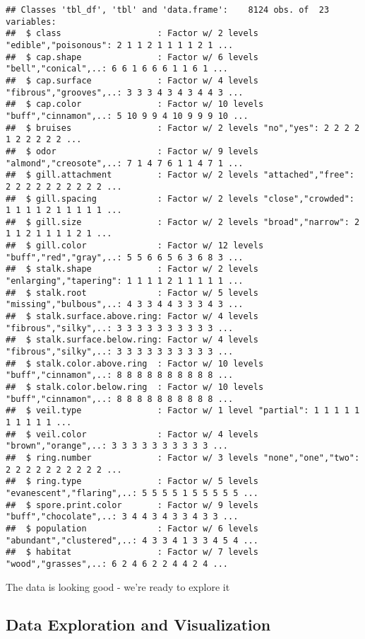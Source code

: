 \documentclass[]{article}
\begin{document}
\begin{verbatim}
## Classes 'tbl_df', 'tbl' and 'data.frame':    8124 obs. of  23 variables:
##  $ class                   : Factor w/ 2 levels "edible","poisonous": 2 1 1 2 1 1 1 1 2 1 ...
##  $ cap.shape               : Factor w/ 6 levels "bell","conical",..: 6 6 1 6 6 6 1 1 6 1 ...
##  $ cap.surface             : Factor w/ 4 levels "fibrous","grooves",..: 3 3 3 4 3 4 3 4 4 3 ...
##  $ cap.color               : Factor w/ 10 levels "buff","cinnamon",..: 5 10 9 9 4 10 9 9 9 10 ...
##  $ bruises                 : Factor w/ 2 levels "no","yes": 2 2 2 2 1 2 2 2 2 2 ...
##  $ odor                    : Factor w/ 9 levels "almond","creosote",..: 7 1 4 7 6 1 1 4 7 1 ...
##  $ gill.attachment         : Factor w/ 2 levels "attached","free": 2 2 2 2 2 2 2 2 2 2 ...
##  $ gill.spacing            : Factor w/ 2 levels "close","crowded": 1 1 1 1 2 1 1 1 1 1 ...
##  $ gill.size               : Factor w/ 2 levels "broad","narrow": 2 1 1 2 1 1 1 1 2 1 ...
##  $ gill.color              : Factor w/ 12 levels "buff","red","gray",..: 5 5 6 6 5 6 3 6 8 3 ...
##  $ stalk.shape             : Factor w/ 2 levels "enlarging","tapering": 1 1 1 1 2 1 1 1 1 1 ...
##  $ stalk.root              : Factor w/ 5 levels "missing","bulbous",..: 4 3 3 4 4 3 3 3 4 3 ...
##  $ stalk.surface.above.ring: Factor w/ 4 levels "fibrous","silky",..: 3 3 3 3 3 3 3 3 3 3 ...
##  $ stalk.surface.below.ring: Factor w/ 4 levels "fibrous","silky",..: 3 3 3 3 3 3 3 3 3 3 ...
##  $ stalk.color.above.ring  : Factor w/ 10 levels "buff","cinnamon",..: 8 8 8 8 8 8 8 8 8 8 ...
##  $ stalk.color.below.ring  : Factor w/ 10 levels "buff","cinnamon",..: 8 8 8 8 8 8 8 8 8 8 ...
##  $ veil.type               : Factor w/ 1 level "partial": 1 1 1 1 1 1 1 1 1 1 ...
##  $ veil.color              : Factor w/ 4 levels "brown","orange",..: 3 3 3 3 3 3 3 3 3 3 ...
##  $ ring.number             : Factor w/ 3 levels "none","one","two": 2 2 2 2 2 2 2 2 2 2 ...
##  $ ring.type               : Factor w/ 5 levels "evanescent","flaring",..: 5 5 5 5 1 5 5 5 5 5 ...
##  $ spore.print.color       : Factor w/ 9 levels "buff","chocolate",..: 3 4 4 3 4 3 3 4 3 3 ...
##  $ population              : Factor w/ 6 levels "abundant","clustered",..: 4 3 3 4 1 3 3 4 5 4 ...
##  $ habitat                 : Factor w/ 7 levels "wood","grasses",..: 6 2 4 6 2 2 4 4 2 4 ...
\end{verbatim}

The data is looking good - we're ready to explore it

\subsection{Data Exploration and
Visualization}\label{data-exploration-and-visualization}
\end{document}

